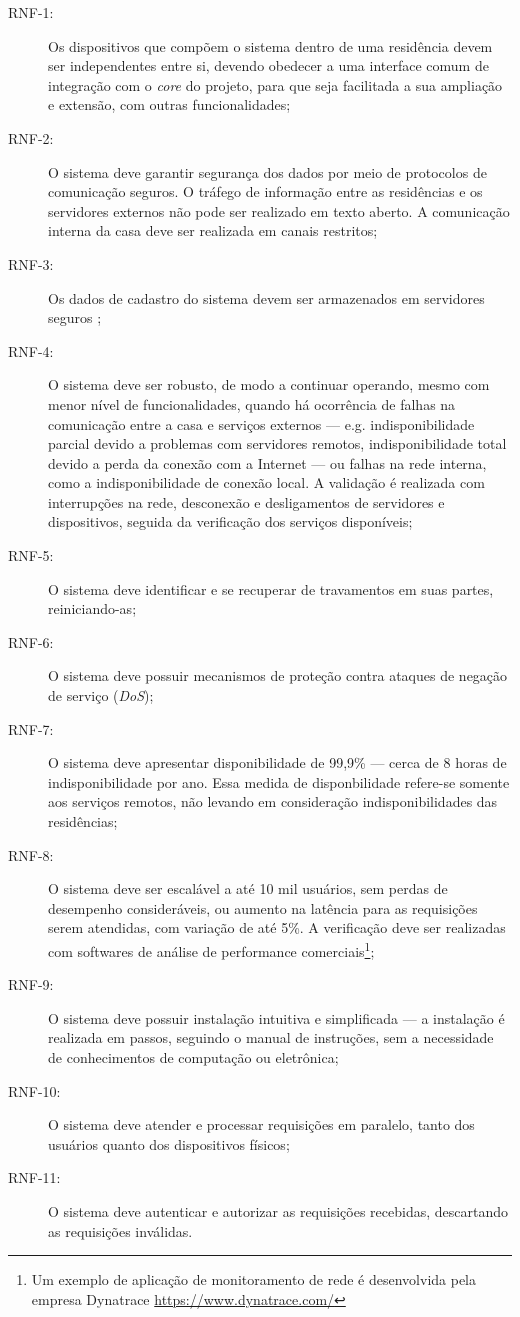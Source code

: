 \begin{description}
\item[RNF-1:]Os dispositivos que compõem o sistema dentro de uma residência devem ser independentes entre si, devendo obedecer a uma interface comum de integração com o \emph{core} do projeto, para que seja facilitada a sua ampliação e extensão, com outras funcionalidades;
\item[RNF-2:]O sistema deve garantir segurança dos dados por meio de protocolos de comunicação seguros. O tráfego de informação entre as residências e os servidores externos não pode ser realizado em texto aberto. A comunicação interna da casa deve ser realizada em canais restritos;
\item[RNF-3:]Os dados de cadastro do sistema devem ser armazenados em servidores seguros \cite{softwareSecurity};
\item[RNF-4:]O sistema deve ser robusto, de modo a continuar operando, mesmo com menor nível de funcionalidades, quando há ocorrência de falhas na comunicação entre a casa e serviços externos --- e.g. indisponibilidade parcial devido a problemas com servidores remotos, indisponibilidade total devido a perda da conexão com a Internet --- ou falhas na rede interna, como a indisponibilidade de conexão local. A validação é realizada com interrupções na rede, desconexão e desligamentos de servidores e dispositivos, seguida da verificação dos serviços disponíveis;
\item[RNF-5:]O sistema deve identificar e se recuperar de travamentos em suas partes, reiniciando-as;
\item[RNF-6:]O sistema deve possuir mecanismos de proteção contra ataques de negação de serviço (\emph{DoS});
\item[RNF-7:]O sistema deve apresentar disponibilidade de 99,9\% --- cerca de 8 horas de indisponibilidade por ano. Essa medida de disponbilidade refere-se somente aos serviços remotos, não levando em consideração indisponibilidades das residências;
\item[RNF-8:]O sistema deve ser escalável a até 10 mil usuários, sem perdas de desempenho consideráveis, ou aumento na latência para as requisições serem atendidas, com variação de até 5\%. A verificação deve ser realizadas com softwares de análise de performance comerciais\footnote{Um exemplo de aplicação de monitoramento de rede é desenvolvida pela empresa Dynatrace \url{https://www.dynatrace.com/} };
\item[RNF-9:]O sistema deve possuir instalação intuitiva e simplificada --- a instalação é realizada em passos, seguindo o manual de instruções, sem a necessidade de conhecimentos de computação ou eletrônica;
\item[RNF-10:]O sistema deve atender e processar requisições em paralelo, tanto dos usuários quanto dos dispositivos físicos;
\item[RNF-11:]O sistema deve autenticar e autorizar as requisições recebidas, descartando as requisições inválidas.
\end{description}

